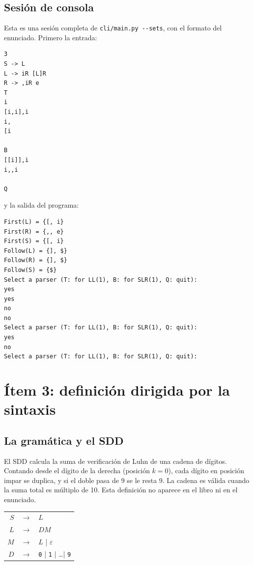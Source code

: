 \documentclass[11pt,a4paper]{article}
\begin{document}
\subsection{Sesión de consola}
Esta es una sesión completa de \texttt{cli/main.py -{}-sets}, con el formato del enunciado. Primero la entrada:
\begin{small}
\begin{verbatim}
3
S -> L
L -> iR [L]R
R -> ,iR e
T
i
[i,i],i
i,
[i

B
[[i]],i
i,,i

Q
\end{verbatim}
\end{small}
y la salida del programa:
\begin{small}
\begin{verbatim}
First(L) = {[, i}
First(R) = {,, e}
First(S) = {[, i}
Follow(L) = {], $}
Follow(R) = {], $}
Follow(S) = {$}
Select a parser (T: for LL(1), B: for SLR(1), Q: quit):
yes
yes
no
no
Select a parser (T: for LL(1), B: for SLR(1), Q: quit):
yes
no
Select a parser (T: for LL(1), B: for SLR(1), Q: quit):
\end{verbatim}
\end{small}

\section{Ítem 3: definición dirigida por la sintaxis}

\subsection{La gramática y el SDD}
El SDD calcula la suma de verificación de Luhn de una cadena de dígitos. Contando desde el dígito de la derecha (posición $k=0$), cada dígito en posición impar se duplica, y si el doble pasa de 9 se le resta 9. La cadena es válida cuando la suma total es múltiplo de 10. Esta definición no aparece en el libro ni en el enunciado.

\begin{center}
\begin{tabular}{rcl}
$S$ & $\to$ & $L$ \\
$L$ & $\to$ & $DM$ \\
$M$ & $\to$ & $L$ \;\;|\;\; $\varepsilon$ \\
$D$ & $\to$ & \texttt{0} \;|\; \texttt{1} \;|\; \dots \;|\; \texttt{9} \\
\end{tabular}
\end{center}
\end{document}
